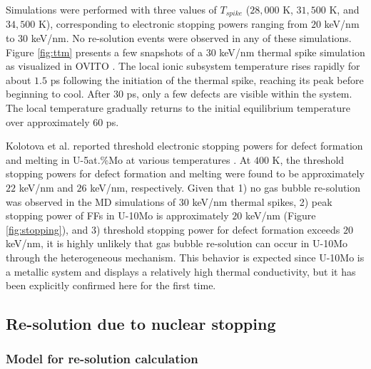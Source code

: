 \documentclass[review]{elsarticle}
\begin{document}
Simulations were performed with three values of $T_{spike}$ ($28,000$ K, $31,500$ K, and $34,500$ K), corresponding to electronic stopping powers ranging from $20$ keV/nm to $30$ keV/nm. No re-solution events were observed in any of these simulations. Figure \ref{fig:ttm} presents a few snapshots of a $30$ keV/nm thermal spike simulation as visualized in OVITO \cite{ovito}. The local ionic subsystem temperature rises rapidly for about $1.5$ ps following the initiation of the thermal spike, reaching its peak before beginning to cool. After $30$ ps, only a few defects are visible within the system. The local temperature gradually returns to the initial equilibrium temperature over approximately $60$ ps.

Kolotova et al. reported threshold electronic stopping powers for defect formation and melting in U-5at.\%Mo at various temperatures \cite{kolotova2017}. At $400$ K, the threshold stopping powers for defect formation and melting were found to be approximately $22$ keV/nm and $26$ keV/nm, respectively. Given that 1) no gas bubble re-solution was observed in the MD simulations of $30$ keV/nm thermal spikes, 2) peak stopping power of FFs in U-10Mo is approximately $20$ keV/nm (Figure \ref{fig:stopping}), and 3) threshold stopping power for defect formation exceeds $20$ keV/nm, it is highly unlikely that gas bubble re-solution can occur in U-10Mo through the heterogeneous mechanism. This behavior is expected since U-10Mo is a metallic system and displays a relatively high thermal conductivity, but it has been explicitly confirmed here for the first time. 

\subsection{Re-solution due to nuclear stopping}
\label{sec:nuke}

\subsubsection{Model for re-solution calculation}
\end{document}
